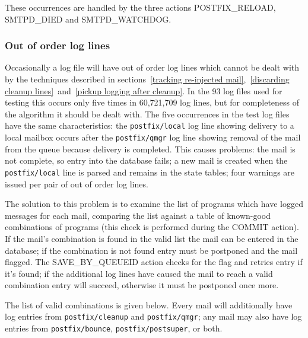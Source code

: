 \documentclass[a4paper,12pt,draft]{article}
\begin{document}
These occurrences are handled by the three actions POSTFIX\_RELOAD,
SMTPD\_DIED and SMTPD\_WATCHDOG\@.

\subsubsection{Out of order log lines}

\label{out of order log lines}

Occasionally a log file will have out of order log lines which cannot be
dealt with by the techniques described in sections~\ref{tracking
re-injected mail},~\ref{discarding cleanup lines}~and~\ref{pickup logging
after cleanup}.  In the 93 log files used for testing this occurs only five
times in 60,721,709 log lines, but for completeness of the algorithm it
should be dealt with.  The five occurrences in the test log files have the
same characteristics: the \texttt{postfix/local} log line showing delivery
to a local mailbox occurs after the \texttt{postfix/qmgr} log line showing
removal of the mail from the queue because delivery is completed.  This
causes problems: the mail is not complete, so entry into the database
fails; a new mail is created when the \texttt{postfix/local} line is parsed
and remains in the state tables; four warnings are issued per pair of out
of order log lines.

The solution to this problem is to examine the list of programs which have
logged messages for each mail, comparing the list against a table of
known-good combinations of programs (this check is performed during the
COMMIT action).  If the mail's combination is found in the valid list the
mail can be entered in the database; if the combination is not found entry
must be postponed and the mail flagged.  The SAVE\_BY\_QUEUEID action
checks for the flag and retries entry if it's found; if the additional log
lines have caused the mail to reach a valid combination entry will succeed,
otherwise it must be postponed once more.

The list of valid combinations is given below.  Every mail will
additionally have log entries from \texttt{postfix/cleanup} and
\texttt{postfix/qmgr}; any mail may also have log entries from
\texttt{postfix/bounce}, \texttt{postfix/postsuper}, or both.
\end{document}
